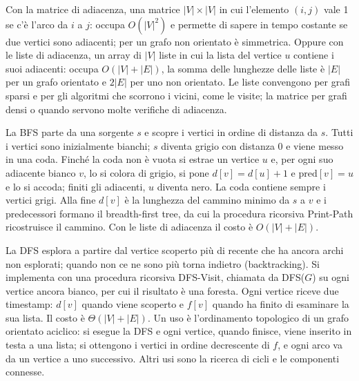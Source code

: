 \begin{orale}
Con la matrice di adiacenza, una matrice $|V| \times |V|$ in cui l'elemento $(i,j)$ vale 1
se c'è l'arco da $i$ a $j$: occupa $O(|V|^2)$ e permette di sapere in tempo costante se
due vertici sono adiacenti; per un grafo non orientato è simmetrica. Oppure con le liste
di adiacenza, un array di $|V|$ liste in cui la lista del vertice $u$ contiene i suoi
adiacenti: occupa $O(|V| + |E|)$, la somma delle lunghezze delle liste è $|E|$ per un
grafo orientato e $2|E|$ per uno non orientato. Le liste convengono per grafi sparsi e per
gli algoritmi che scorrono i vicini, come le visite; la matrice per grafi densi o quando
servono molte verifiche di adiacenza.
\end{orale}

\begin{orale}
La BFS parte da una sorgente $s$ e scopre i vertici in ordine di distanza da $s$. Tutti i
vertici sono inizialmente bianchi; $s$ diventa grigio con distanza 0 e viene messo in una
coda. Finché la coda non è vuota si estrae un vertice $u$ e, per ogni suo adiacente
bianco $v$, lo si colora di grigio, si pone $d[v] = d[u] + 1$ e $\text{pred}[v] = u$ e lo
si accoda; finiti gli adiacenti, $u$ diventa nero. La coda contiene sempre i vertici
grigi. Alla fine $d[v]$ è la lunghezza del cammino minimo da $s$ a $v$ e i predecessori
formano il breadth-first tree, da cui la procedura ricorsiva Print-Path ricostruisce il
cammino. Con le liste di adiacenza il costo è $O(|V| + |E|)$.
\end{orale}

\begin{orale}
La DFS esplora a partire dal vertice scoperto più di recente che ha ancora archi non
esplorati; quando non ce ne sono più torna indietro (backtracking). Si implementa con una
procedura ricorsiva DFS-Visit, chiamata da DFS($G$) su ogni vertice ancora bianco, per cui
il risultato è una foresta. Ogni vertice riceve due timestamp: $d[v]$ quando viene
scoperto e $f[v]$ quando ha finito di esaminare la sua lista. Il costo è
$\Theta(|V| + |E|)$. Un uso è l'ordinamento topologico di un grafo orientato aciclico:
si esegue la DFS e ogni vertice, quando finisce, viene inserito in testa a una lista; si
ottengono i vertici in ordine decrescente di $f$, e ogni arco va da un vertice a uno
successivo. Altri usi sono la ricerca di cicli e le componenti connesse.
\end{orale}

